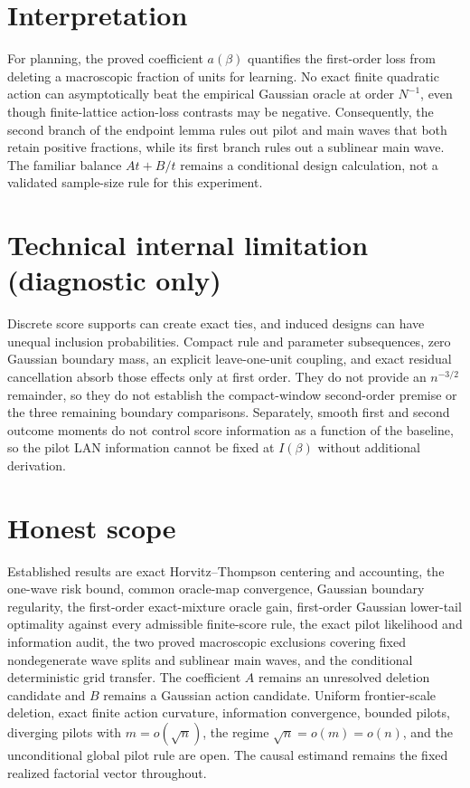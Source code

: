 \documentclass{article}
\begin{document}
\section{Interpretation}

For planning, the proved coefficient \(a(\beta)\) quantifies the first-order loss from deleting a macroscopic fraction of units for learning.  No exact finite quadratic action can asymptotically beat the empirical Gaussian oracle at order \(N^{-1}\), even though finite-lattice action-loss contrasts may be negative.  Consequently, the second branch of the endpoint lemma rules out pilot and main waves that both retain positive fractions, while its first branch rules out a sublinear main wave.  The familiar balance \(A t+B/t\) remains a conditional design calculation, not a validated sample-size rule for this experiment.

\section*{Technical internal limitation (diagnostic only)}

Discrete score supports can create exact ties, and induced designs can have unequal inclusion probabilities. Compact rule and parameter subsequences, zero Gaussian boundary mass, an explicit leave-one-unit coupling, and exact residual cancellation absorb those effects only at first order. They do not provide an \(n^{-3/2}\) remainder, so they do not establish the compact-window second-order premise or the three remaining boundary comparisons. Separately, smooth first and second outcome moments do not control score information as a function of the baseline, so the pilot LAN information cannot be fixed at \(I(\beta)\) without additional derivation.

\section{Honest scope}

Established results are exact Horvitz--Thompson centering and accounting, the one-wave risk bound, common oracle-map convergence, Gaussian boundary regularity, the first-order exact-mixture oracle gain, first-order Gaussian lower-tail optimality against every admissible finite-score rule, the exact pilot likelihood and information audit, the two proved macroscopic exclusions covering fixed nondegenerate wave splits and sublinear main waves, and the conditional deterministic grid transfer. The coefficient \(A\) remains an unresolved deletion candidate and \(B\) remains a Gaussian action candidate. Uniform frontier-scale deletion, exact finite action curvature, information convergence, bounded pilots, diverging pilots with \(m=o(\sqrt n)\), the regime \(\sqrt n=o(m)=o(n)\), and the unconditional global pilot rule are open. The causal estimand remains the fixed realized factorial vector throughout.
\end{document}
